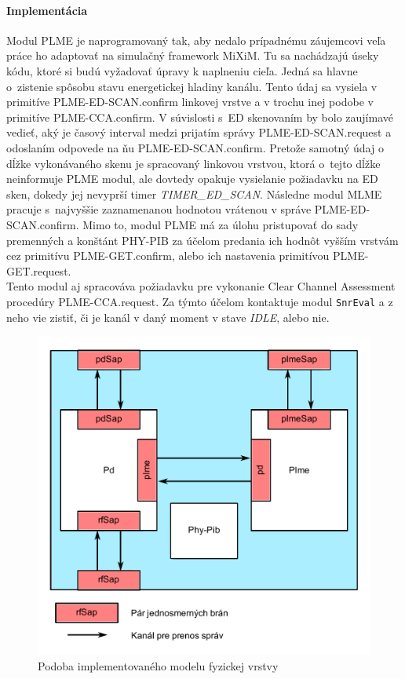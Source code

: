 \paragraph{Implementácia}
Modul PLME je naprogramovaný tak, aby nedalo prípadnému záujemcovi veľa práce ho adaptovať na simulačný framework MiXiM. Tu sa nachádzajú úseky kódu, ktoré si budú vyžadovať úpravy k naplneniu cieľa. Jedná sa hlavne o~zistenie spôsobu stavu energetickej hladiny kanálu. Tento údaj sa vysiela v primitíve PLME-ED-SCAN.confirm linkovej vrstve a v trochu inej podobe v primitíve PLME-CCA.confirm. V súvislosti s~ED skenovaním by bolo zaujímavé vedieť, aký je časový interval medzi prijatím správy PLME-ED-SCAN.request a odoslaním odpovede na ňu PLME-ED-SCAN.confirm. Pretože samotný údaj o dĺžke vykonávaného skenu je spracovaný linkovou vrstvou, ktorá o~tejto dĺžke neinformuje PLME modul, ale dovtedy opakuje vysielanie požiadavku na ED sken, dokedy jej nevyprší timer \textit{TIMER\_ED\_SCAN}. Následne modul MLME pracuje s~najvyššie zaznamenanou hodnotou vrátenou v správe PLME-ED-SCAN.confirm. Mimo to, modul PLME má za úlohu pristupovať do sady premenných a konštánt PHY-PIB za účelom predania ich hodnôt vyšším vrstvám cez primitívu PLME-GET.confirm, alebo ich nastavenia primitívou PLME-GET.request.\\
\indent Tento modul aj spracováva požiadavku pre vykonanie Clear Channel Assessment procedúry PLME-CCA.request. Za týmto účelom kontaktuje modul \texttt{SnrEval} a z neho vie zistiť, či je kanál v daný moment v stave \textit{IDLE}, alebo nie.\\
\begin{figure}[htbp]
\begin{center}
\includegraphics[width=120mm]{figures/architecture_phy}
\caption{Podoba implementovaného modelu fyzickej vrstvy}
\label{fig:architecture_phy}
\end{center}
\end{figure}
